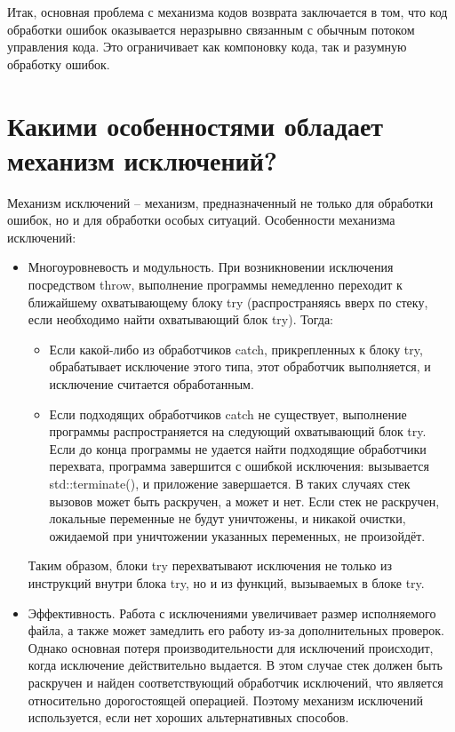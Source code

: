 \documentclass[a4paper,12pt]{article}	%
\begin{document}
	Итак, основная проблема с механизма кодов возврата заключается в том, что код обработки ошибок оказывается неразрывно связанным с обычным потоком управления кода. Это ограничивает как компоновку кода, так и разумную обработку ошибок.

\newpage

\section{Какими особенностями обладает механизм исключений?}
	
	Механизм исключений -- механизм, предназначенный не только для обработки ошибок, но и для обработки особых ситуаций. Особенности механизма исключений:
	
	\begin{itemize}
	
		\item Многоуровневость и модульность. При возникновении исключения посредством throw, выполнение программы немедленно переходит к ближайшему охватывающему блоку try (распространяясь вверх по стеку, если необходимо найти охватывающий блок try). Тогда:
		
		\begin{itemize}
		
			\item Если какой-либо из обработчиков catch, прикрепленных к блоку try, обрабатывает исключение этого типа, этот обработчик выполняется, и исключение считается обработанным.
		
			\item Если подходящих обработчиков catch не существует, выполнение программы распространяется на следующий охватывающий блок try. Если до конца программы не удается найти подходящие обработчики перехвата, программа завершится с ошибкой исключения: вызывается std::terminate(), и приложение завершается. В таких случаях стек вызовов может быть раскручен, а может и нет. Если стек не раскручен, локальные переменные не будут уничтожены, и никакой очистки, ожидаемой при уничтожении указанных переменных, не произойдёт.
		
		\end{itemize}
		
		Таким образом, блоки try перехватывают исключения не только из инструкций внутри блока try, но и из функций, вызываемых в блоке try.
		
		\item Эффективность. Работа с исключениями увеличивает размер исполняемого файла, а также может замедлить его работу из-за дополнительных проверок. Однако основная потеря производительности для исключений происходит, когда исключение действительно выдается. В этом случае стек должен быть раскручен и найден соответствующий обработчик исключений, что является относительно дорогостоящей операцией. Поэтому механизм исключений используется, если нет хороших альтернативных способов.
		

\end{itemize}
\end{document}
